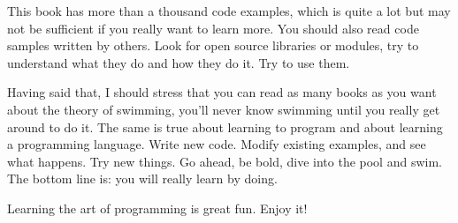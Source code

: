 This book has more than a thousand code examples, which is quite 
a lot but may not be sufficient if you really want to learn more. 
You should also read code samples written by others. Look for 
open source libraries or modules, try to understand what they 
do and how they do it. Try to use them.

Having said that, I should stress that you can read as many books 
as you want about the theory of swimming, you'll never know 
swimming until you really get around to do it. The same is true 
about learning to program and about learning a programming 
language. Write new code. Modify existing examples, and see what 
happens. Try new things. Go ahead, be bold, dive into the pool and
swim. The bottom line is: you will really learn by doing.

Learning the art of programming is great fun. Enjoy it!

